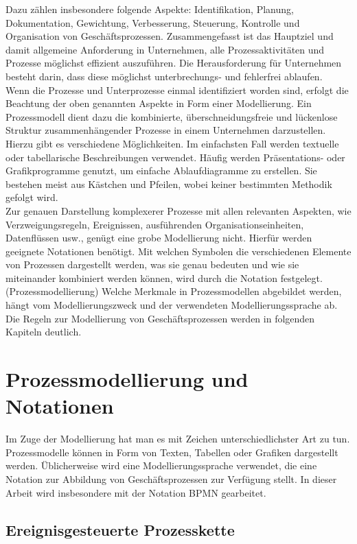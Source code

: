 Dazu zählen insbesondere folgende Aspekte:
Identifikation, Planung, Dokumentation,  Gewichtung, Verbesserung,
Steuerung, Kontrolle und Organisation von Geschäftsprozessen.
Zusammengefasst ist das Hauptziel und damit allgemeine Anforderung in Unternehmen,
alle Prozessaktivitäten und Prozesse möglichst effizient auszuführen.
Die Herausforderung für Unternehmen besteht darin, dass diese
möglichst unterbrechungs- und fehlerfrei ablaufen.\\

Wenn die Prozesse und Unterprozesse einmal identifiziert worden sind,
erfolgt die Beachtung der oben genannten Aspekte in Form einer Modellierung.
Ein Prozessmodell dient dazu die kombinierte, überschneidungsfreie
und lückenlose Struktur zusammenhängender Prozesse in einem Unternehmen darzustellen.
Hierzu gibt es verschiedene Möglichkeiten.
Im einfachsten Fall werden textuelle oder tabellarische Beschreibungen verwendet.
Häufig werden Präsentations- oder Grafikprogramme genutzt, um einfache Ablaufdiagramme
zu erstellen. Sie bestehen meist aus Kästchen und Pfeilen, wobei keiner
bestimmten Methodik gefolgt wird.\\
Zur genauen Darstellung komplexerer Prozesse mit allen relevanten Aspekten,
wie Verzweigungsregeln,
Ereignissen, ausführenden Organisationseinheiten, Datenflüssen usw.,
genügt eine grobe Modellierung nicht. Hierfür werden geeignete Notationen benötigt.
Mit welchen Symbolen die verschiedenen Elemente von Prozessen dargestellt werden,
was sie genau bedeuten und wie sie miteinander kombiniert werden können,
wird durch die Notation festgelegt. (Prozessmodellierung)
Welche Merkmale in Prozessmodellen abgebildet werden, hängt vom
Modellierungszweck und der verwendeten Modellierungssprache ab.
Die Regeln zur Modellierung von Geschäftsprozessen werden in folgenden Kapiteln deutlich.

\clearpage
\section{Prozessmodellierung und Notationen}

Im Zuge der Modellierung hat man es mit Zeichen unterschiedlichster Art zu tun.
Prozessmodelle können in Form von Texten, Tabellen oder Grafiken dargestellt werden.
Üblicherweise wird eine Modellierungssprache verwendet,
die eine Notation zur Abbildung von Geschäftsprozessen zur Verfügung stellt.
In dieser Arbeit wird insbesondere mit der Notation BPMN gearbeitet.

\subsection{Ereignisgesteuerte Prozesskette}

